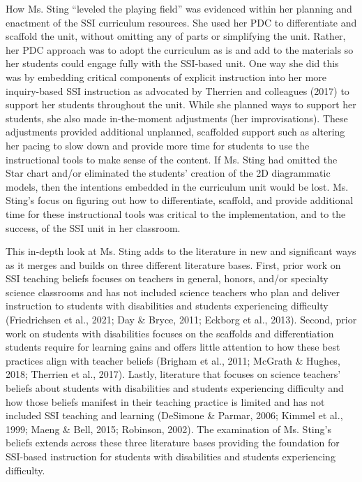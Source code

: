 \documentclass[11.5pt]{sig-alternate}
\begin{document}
\begin{large}
How Ms. Sting “leveled the playing field” was evidenced within her planning and enactment of the SSI curriculum resources. She used her PDC to differentiate and scaffold the unit, without omitting any of parts or simplifying the unit. Rather, her PDC approach was to adopt the curriculum as is and add to the materials so her students could engage fully with the SSI-based unit. One way she did this was by embedding critical components of explicit instruction into her more inquiry-based SSI instruction as advocated by Therrien and colleagues (2017) to support her students throughout the unit. While she planned ways to support her students, she also made in-the-moment adjustments (her improvisations). These adjustments provided additional unplanned, scaffolded support such as altering her pacing to slow down and provide more time for students to use the instructional tools to make sense of the content. If Ms. Sting had omitted the Star chart and/or eliminated the students’ creation of the 2D diagrammatic models, then the intentions embedded in the curriculum unit would be lost. Ms. Sting’s focus on figuring out how to differentiate, scaffold, and provide additional time for these instructional tools was critical to the implementation, and to the success, of the SSI unit in her classroom.

This in-depth look at Ms. Sting adds to the literature in new and significant ways as it merges and builds on three different literature bases. First, prior work on SSI teaching beliefs focuses on teachers in general, honors, and/or specialty science classrooms and has not included science teachers who plan and deliver instruction to students with disabilities and students experiencing difficulty (Friedrichsen et al., 2021; Day \& Bryce, 2011; Eckborg et al., 2013). Second, prior work on students with disabilities focuses on the scaffolds and differentiation students require for learning gains and offers little attention to how these best practices align with teacher beliefs (Brigham et al., 2011; McGrath \& Hughes, 2018; Therrien et al., 2017). Lastly, literature that focuses on science teachers’ beliefs about students with disabilities and students experiencing difficulty and how those beliefs manifest in their teaching practice is limited and has not included SSI teaching and learning (DeSimone \& Parmar, 2006; Kimmel et al., 1999; Maeng \& Bell, 2015; Robinson, 2002). The examination of Ms. Sting’s beliefs extends across these three literature bases providing the foundation for SSI-based instruction for students with disabilities and students experiencing difficulty.


\end{large}
\end{document}
